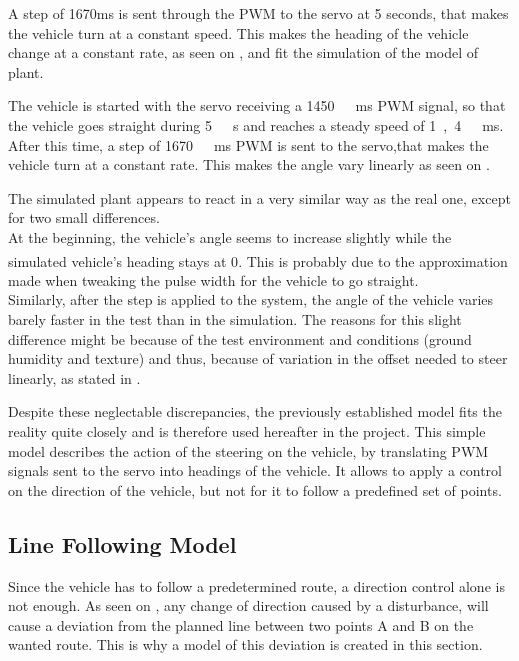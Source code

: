 A step of 1670ms is sent through the PWM to the servo at 5 seconds, that makes the vehicle turn at a constant speed. This makes the heading of the vehicle change at a constant rate, as seen on , and fit the simulation of the model of plant.


The vehicle is started with the servo receiving a \si{1450\ ms} PWM signal, so that the vehicle goes straight during \si{5\ s} and reaches a steady speed of \si{1,4\ ms}. 
After this time, a step of \si{1670\ ms} PWM is sent to the servo,that makes the vehicle turn at a constant rate. This makes the angle vary linearly as seen on .

The simulated plant appears to react in a very similar way as the real one, except for two small differences.\\
At the beginning, the vehicle's angle seems to increase slightly while the simulated vehicle's heading stays at \si{0^{\circ}}. This is probably due to the approximation made when tweaking the pulse width for the vehicle to go straight.\\
Similarly, after the step is applied to the system, the angle of the vehicle varies barely faster in the test than in the simulation. The reasons for this slight difference might be because of the test environment and conditions (ground humidity and texture) and thus, because of variation in the offset needed to steer linearly, as stated in .

Despite these neglectable discrepancies, the previously established model fits the reality quite closely and is therefore used hereafter in the project. This simple model describes the action of the steering on the vehicle, by translating PWM signals sent to the servo into headings of the vehicle. It allows to apply a control on the direction of the vehicle, but not for it to follow a predefined set of points.

\subsection{Line Following Model}
Since the vehicle has to follow a predetermined route, a direction control alone is not enough. As seen on , any change of direction caused by a disturbance, will cause a deviation from the planned line between two points A and B on the wanted route. This is why a model of this deviation is created in this section.

